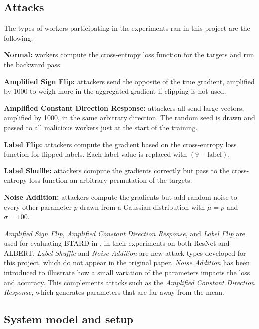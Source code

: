 \documentclass{article}
\begin{document}
\subsection{Attacks}
The types of workers participating in the experiments ran in this project are the following:
\begin{description}
\item \textbf{Normal:} workers compute the cross-entropy loss function for the targets and run the backward pass.
\item \textbf{Amplified Sign Flip:} attackers send the opposite of the true gradient, amplified by 1000 to weigh more in the aggregated gradient if clipping is not used. 
\item \textbf{Amplified Constant Direction Response:} attackers all send large vectors, amplified by 1000, in the same arbitrary direction. The random seed is drawn and passed to all malicious workers just at the start of the training.
\item \textbf{Label Flip:} attackers compute the gradient based on the cross-entropy loss function for flipped labels. Each label value is replaced with $(9 - \text{label})$.
\item \textbf{Label Shuffle:} attackers compute the gradients correctly but pass to the cross-entropy loss function an arbitrary permutation of the targets.
\item \textbf{Noise Addition:} attackers compute the gradients but add random noise to every other parameter $p$ drawn from a Gaussian distribution with $\mu = p$ and $\sigma = 100$.
\end{description}

\textit{Amplified Sign Flip}, \textit{Amplified Constant Direction Response}, and \textit{Label Flip} are used for evaluating BTARD in \cite{gorbunov2021secure}, in their experiments on both ResNet and ALBERT. 
\textit{Label Shuffle} and \textit{Noise Addition} are new attack types developed for this project, which do not appear in the original paper. \textit{Noise Addition} has been introduced to illustrate how a small variation of the parameters impacts the loss and accuracy. This complements attacks such as the \textit{Amplified Constant Direction Response}, which generates parameters that are far away from the mean.

\subsection{System model and setup}
\end{document}

